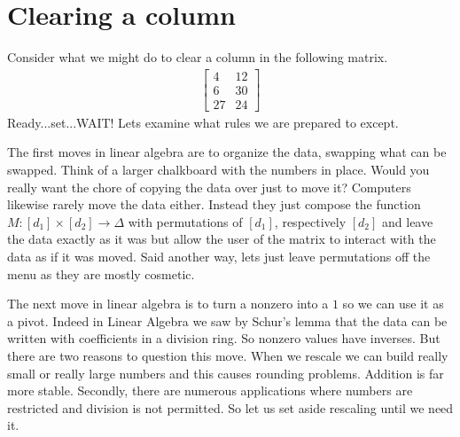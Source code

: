 \documentclass[12pt,twoside,dvipsnames,letterpaper]{memoir}
\begin{document}
\section{Clearing a column}


Consider what we might do to clear a column in the following matrix.
\begin{align*}
    \begin{bmatrix}
        4 & 12 \\
        6 & 30 \\
        27 & 24
     \end{bmatrix}
\end{align*}
Ready...set...WAIT!  Lets examine what rules we are prepared to except.

The first moves in linear algebra are to organize the data, swapping 
what can be swapped.  Think of a larger chalkboard with the numbers in 
place.  Would you really want the chore of copying the data over just 
to move it?  Computers likewise rarely move the data either.  Instead 
they just compose the function $M:[d_1]\times [d_2]\to \Delta$ 
with permutations of $[d_1]$, respectively $[d_2]$ and leave the data 
exactly as it was but allow the user of the matrix to interact with the 
data as if it was moved.  Said another way, lets just leave permutations 
off the menu as they are mostly cosmetic.

The next move in linear algebra is to turn a nonzero into a $1$ so 
we can use it as a pivot.  Indeed in Linear Algebra we saw by 
Schur's lemma that the data can be written with coefficients in 
a division ring.  So nonzero values have inverses.  But there 
are two reasons to question this move.  When we rescale we can 
build really small or really large numbers and this causes rounding 
problems.  Addition is far more stable.  Secondly, there are numerous 
applications where numbers are restricted and division is 
not permitted.  So let us set aside rescaling until we need it.
\end{document}
